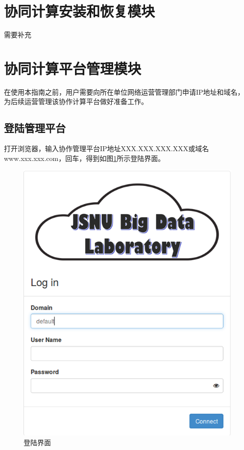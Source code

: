 \documentclass[12pt]{ctexart}%
\begin{document}
\section {协同计算安装和恢复模块}
需要补充
\section{协同计算平台管理模块}
在使用本指南之前，用户需要向所在单位网络运营管理部门申请IP地址和域名，为后续运营管理该协作计算平台做好准备工作。
\subsection{登陆管理平台}
打开浏览器，输入协作管理平台IP地址XXX.XXX.XXX.XXX或域名www.xxx.xxx.com，回车，得到如图\ref{fig:login}所示登陆界面。

\begin{figure}[!htb]
\centering
\includegraphics[width=5in]{./figures/login}
\caption{登陆界面}
\label{fig:login}
\end{figure}
\end{document}
